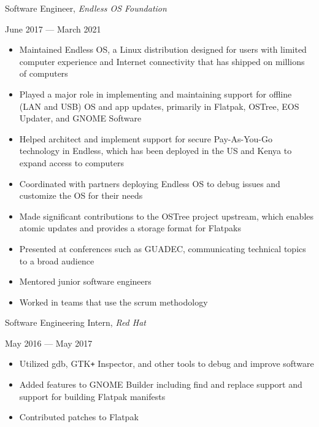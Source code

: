 \documentclass[11pt]{article}
\begin{document}
\begin{minipage}[t]{0.65\textwidth}
\flushleft
Software Engineer, \textit{Endless OS Foundation}\\
\end{minipage}
\begin{minipage}[t]{0.30\textwidth}
\flushright
June 2017 --- March 2021\\
\end{minipage}

\begin{itemize}
  \item Maintained Endless OS, a Linux distribution designed for users with limited computer experience and Internet connectivity that has shipped on millions of computers
  \item Played a major role in implementing and maintaining support for offline (LAN and USB) OS and app updates, primarily in Flatpak, OSTree, EOS Updater, and GNOME Software
  \item Helped architect and implement support for secure Pay-As-You-Go technology in Endless, which has been deployed in the US and Kenya to expand access to computers
  \item Coordinated with partners deploying Endless OS to debug issues and customize the OS for their needs
  \item Made significant contributions to the OSTree project upstream, which enables atomic updates and \mbox{provides} a storage format for Flatpaks
  \item Presented at conferences such as GUADEC, communicating technical topics to a broad audience
  \item Mentored junior software engineers
  \item Worked in teams that use the scrum methodology
\end{itemize}

\newpage

\begin{minipage}[t]{0.65\textwidth}
\flushleft
Software Engineering Intern, \textit{Red Hat}\\
\end{minipage}
\begin{minipage}[t]{0.30\textwidth}
\flushright
May 2016 --- May 2017\\
\end{minipage}

\begin{itemize}
  \item Utilized gdb, GTK\texttt{+} Inspector, and other tools to debug and improve software
  \item Added features to GNOME Builder including find and replace support and support for building Flatpak manifests
  \item Contributed patches to Flatpak
\end{itemize}
\end{document}
